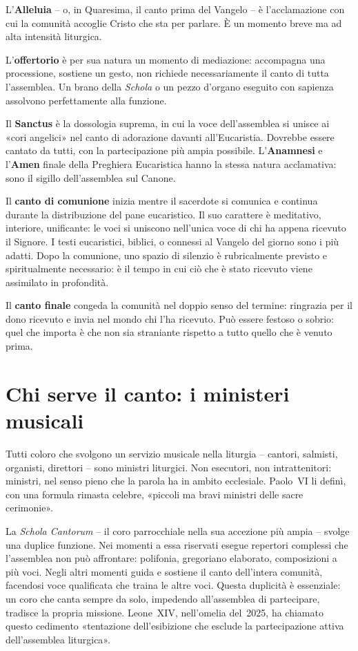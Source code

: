 \documentclass[12pt,a4paper]{article}
\begin{document}
	L'\textbf{Alleluia} -- o, in Quaresima, il canto prima del Vangelo -- è
	l'acclamazione con cui la comunità accoglie Cristo che sta per parlare. È un
	momento breve ma ad alta intensità liturgica.
	
	L'\textbf{offertorio} è per sua natura un momento di mediazione: accompagna una
	processione, sostiene un gesto, non richiede necessariamente il canto di tutta
	l'assemblea. Un brano della \emph{Schola} o un pezzo d'organo eseguito con
	sapienza assolvono perfettamente alla funzione.
	
	Il \textbf{Sanctus} è la dossologia suprema, in cui la voce dell'assemblea si
	unisce ai «cori angelici» nel canto di adorazione davanti all'Eucaristia.
	Dovrebbe essere cantato da tutti, con la partecipazione più ampia possibile.
	L'\textbf{Anamnesi} e l'\textbf{Amen} finale della Preghiera Eucaristica hanno
	la stessa natura acclamativa: sono il sigillo dell'assemblea sul Canone.
	
	Il \textbf{canto di comunione} inizia mentre il sacerdote si comunica e continua
	durante la distribuzione del pane eucaristico. Il suo carattere è meditativo,
	interiore, unificante: le voci si uniscono nell'unica voce di chi ha appena
	ricevuto il Signore. I testi eucaristici, biblici, o connessi al Vangelo del
	giorno sono i più adatti. Dopo la comunione, uno spazio di silenzio è
	rubricalmente previsto e spiritualmente necessario: è il tempo in cui ciò che è
	stato ricevuto viene assimilato in profondità.
	
	Il \textbf{canto finale} congeda la comunità nel doppio senso del termine:
	ringrazia per il dono ricevuto e invia nel mondo chi l'ha ricevuto. Può essere
	festoso o sobrio: quel che importa è che non sia straniante rispetto a tutto
	quello che è venuto prima.
	
	\section{Chi serve il canto: i ministeri musicali}
	
	Tutti coloro che svolgono un servizio musicale nella liturgia -- cantori,
	salmisti, organisti, direttori -- sono ministri liturgici. Non esecutori, non
	intrattenitori: ministri, nel senso pieno che la parola ha in ambito ecclesiale.
	Paolo~VI li definì, con una formula rimasta celebre, «piccoli ma bravi ministri
	delle sacre cerimonie».
	
	La \emph{Schola Cantorum} -- il coro parrocchiale nella sua accezione più ampia
	-- svolge una duplice funzione. Nei momenti a essa riservati esegue repertori
	complessi che l'assemblea non può affrontare: polifonia, gregoriano elaborato,
	composizioni a più voci. Negli altri momenti guida e sostiene il canto
	dell'intera comunità, facendosi voce qualificata che traina le altre voci. Questa
	duplicità è essenziale: un coro che canta sempre da solo, impedendo all'assemblea
	di partecipare, tradisce la propria missione. Leone~XIV, nell'omelia del~2025, ha
	chiamato questo cedimento «tentazione dell'esibizione che esclude la
	partecipazione attiva dell'assemblea liturgica».
	
\end{document}
